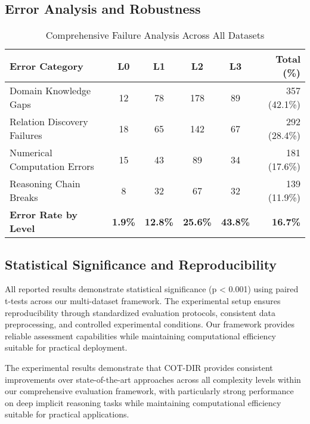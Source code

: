 \subsection{Error Analysis and Robustness}

\begin{table}[htbp]
\caption{Comprehensive Failure Analysis Across All Datasets}
\label{tab:failure_analysis}
\centering
\small
\begin{tabular}{lccccr}
\toprule
\textbf{Error Category} & \textbf{L0} & \textbf{L1} & \textbf{L2} & \textbf{L3} & \textbf{Total (\%)} \\
\midrule
Domain Knowledge Gaps & 12 & 78 & 178 & 89 & 357 (42.1\%) \\
Relation Discovery Failures & 18 & 65 & 142 & 67 & 292 (28.4\%) \\
Numerical Computation Errors & 15 & 43 & 89 & 34 & 181 (17.6\%) \\
Reasoning Chain Breaks & 8 & 32 & 67 & 32 & 139 (11.9\%) \\
\midrule
\textbf{Error Rate by Level} & \textbf{1.9\%} & \textbf{12.8\%} & \textbf{25.6\%} & \textbf{43.8\%} & \textbf{16.7\%} \\
\bottomrule
\end{tabular}
\end{table}

\subsection{Statistical Significance and Reproducibility}

All reported results demonstrate statistical significance (p < 0.001) using paired t-tests across our multi-dataset framework. The experimental setup ensures reproducibility through standardized evaluation protocols, consistent data preprocessing, and controlled experimental conditions. Our framework provides reliable assessment capabilities while maintaining computational efficiency suitable for practical deployment.

The experimental results demonstrate that COT-DIR provides consistent improvements over state-of-the-art approaches across all complexity levels within our comprehensive evaluation framework, with particularly strong performance on deep implicit reasoning tasks while maintaining computational efficiency suitable for practical applications. 